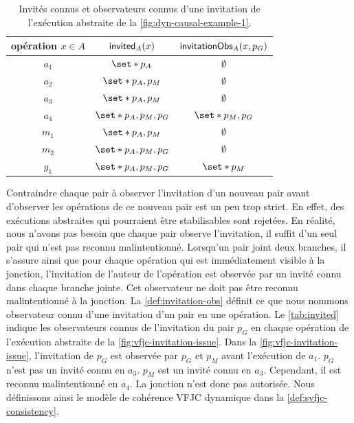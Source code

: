 \begin{table}[htb]
    \centering
    \begin{tabular}{ccc}
        opération $x \in A$ & $\operatorname{\mathsf{invited}}_A(x)$ & $\operatorname{\mathsf{invitationObs}}_A(x,p_G)$ \\
        \toprule
        $a_1$ & $\set*{p_A}$ & $\emptyset$ \\
        $a_2$ & $\set*{p_A, p_M}$ & $\emptyset$ \\
        $a_3$ & $\set*{p_A, p_M}$ & $\emptyset$ \\
        $a_4$ & $\set*{p_A, p_M,p_G}$ & $\set*{p_M,p_G}$\\
        $m_1$ & $\set*{p_A, p_M}$ & $\emptyset$ \\
        $m_2$ & $\set*{p_A, p_M,p_G}$ & $\emptyset$ \\
        $g_1$ & $\set*{p_A, p_M,p_G}$ & $\set*{p_M}$ \\
    \end{tabular}
    \caption[Invités connus et observateurs connus d'une invitation]{Invités connus et observateurs connus d'une invitation de l'exécution abstraite de la \autoref{fig:dyn-causal-example-1}.}\label{tab:invited}
\end{table}

Contraindre chaque pair à observer l'invitation d'un nouveau pair avant d'observer les opérations de ce nouveau pair est un peu trop strict.
En effet, des exécutions abstraites qui pourraient être stabilisables sont rejetées.
En réalité, nous n'avons pas besoin que chaque pair observe l'invitation, il suffit d'un seul pair qui n'est pas reconnu malintentionné.
Lorsqu'un pair joint deux branches, il s'assure ainsi que pour chaque opération qui est immédiatement visible à la jonction, l'invitation de l'auteur de l'opération est observée par un invité connu dans chaque branche jointe.
Cet observateur ne doit pas être reconnu malintentionné à la jonction.
La \autoref{def:invitation-obs} définit ce que nous nommons observateur connu d'une invitation d'un pair en une opération.
Le \autoref{tab:invited} indique les observateurs connus de l'invitation du pair $p_G$ en chaque opération de l'exécution abstraite de la \autoref{fig:vfjc-invitation-issue}.
Dans la \autoref{fig:vfjc-invitation-issue}, l'invitation de $p_G$ est observée par $p_G$ et $p_M$ avant l'exécution de $a_1$.
$p_G$ n'est pas un invité connu en $a_3$.
$p_M$ est un invité connu en $a_3$.
Cependant, il est reconnu malintentionné en $a_4$.
La jonction n'est donc pas autorisée.
Nous définissons ainsi le modèle de cohérence \ac{VFJC} dynamique dans la \autoref{def:svfjc-consistency}.

